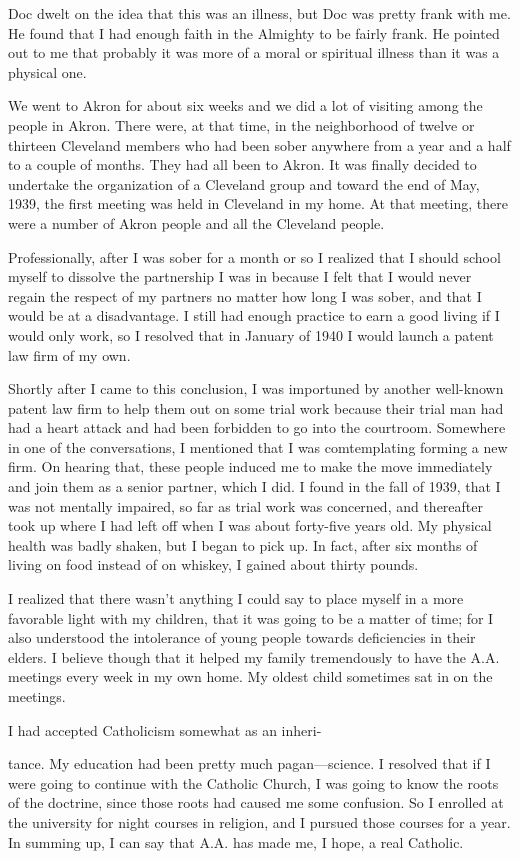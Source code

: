 \begin{biblechapter}
Doc dwelt on the idea that this was an illness, but Doc was pretty frank with me. He found that I had enough faith in the Almighty to be fairly frank. He pointed out to me that probably it was more of a moral or spiritual illness than it was a physical one.

We went to Akron for about six weeks and we did a lot of visiting among the people in Akron. There were, at that time, in the neighborhood of twelve or thirteen Cleveland members who had been sober anywhere from a year and a half to a couple of months. They had all been to Akron. It was finally decided to undertake the organization of a Cleveland group and toward the end of May, 1939, the first meeting was held in Cleveland in my home. At that meeting, there were a number of Akron people and all the Cleveland people.

       Professionally, after I was sober for a month or so I realized that I should school myself to dissolve the partnership I was in because I felt that I would never regain the respect of my partners no matter how long I was sober, and that I would be at a disadvantage. I still had enough practice to earn a good living if I would only work, so I resolved that in January of 1940 I would launch a patent law firm of my own.

Shortly after I came to this conclusion, I was importuned by another well-known patent law firm to help them out on some trial work because their trial man had had a heart attack and had been forbidden to go into the courtroom. Somewhere in one of the conversations, I mentioned that I was comtemplating forming a new firm. On hearing that, these people induced me to make the move immediately and join them as a senior partner, which I did. I found in the fall of 1939, that I was not mentally impaired, so far as trial work was concerned, and thereafter took up where I had left off when I was about forty-five years old. My physical health was badly shaken, but I began to pick up. In fact, after six months of living on food instead of on whiskey, I gained about thirty pounds.

I realized that there wasn’t anything I could say to place myself in a more favorable light with my children, that it was going to be a matter of time; for I also understood the intolerance of young people towards deficiencies in their elders. I believe though that it helped my family tremendously to have the A.A. meetings every week in my own home. My oldest child sometimes sat in on the meetings.

I had accepted Catholicism somewhat as an inheri-

tance. My education had been pretty much pagan—science. I resolved that if I were going to continue with the Catholic Church, I was going to know the roots of the doctrine, since those roots had caused me some confusion. So I enrolled at the university for night courses in religion, and I pursued those courses for a year. In summing up, I can say that A.A. has made me, I hope, a real Catholic.

\end{biblechapter}
